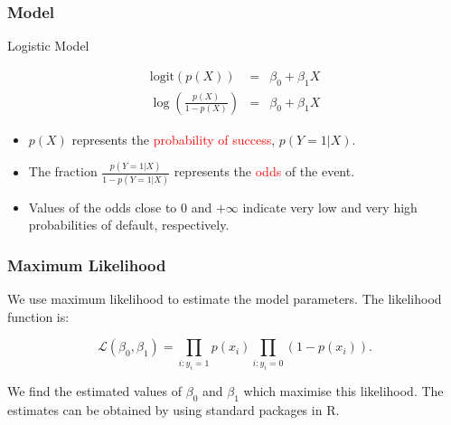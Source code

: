 \documentclass{beamer}
\begin{document}
\frame
{\frametitle{Model}
\begin{block}{Logistic Model}

\begin{eqnarray*}
\textrm{logit}\left(p(X)\right) &=& \beta_0 + \beta_1 X \\
\log \left(\frac{p(X)}{1-p(X)}\right) &=& \beta_0 + \beta_1 X
\end{eqnarray*}
\end{block}

\vspace{0.5cm}
\pause \begin{itemize}
\item $p(X)$ represents the \textcolor{red}{probability of success}, $p(Y=1|X)$.
\item The fraction $\displaystyle\frac{p(Y=1|X)}{1-p(Y=1|X)}$ represents the \textcolor{red}{odds} of the event.
\item Values of the odds close to 0 and $+\infty$ indicate very low and very high probabilities of default, respectively.

\end{itemize}
}

\frame
{\frametitle{Maximum Likelihood}
We use maximum likelihood to estimate the model parameters. The likelihood function is:

\[\mathcal{L}(\beta_0, \beta_1) = \prod_{i:y_i=1} p(x_i) \prod_{i:y_i=0} \left(1-p(x_i)\right).  \]

\vspace{0.5cm}
We find the estimated values of $\beta_0$ and $\beta_1$ which maximise this likelihood. The estimates can be obtained by using standard packages in R.

}

\end{document}

